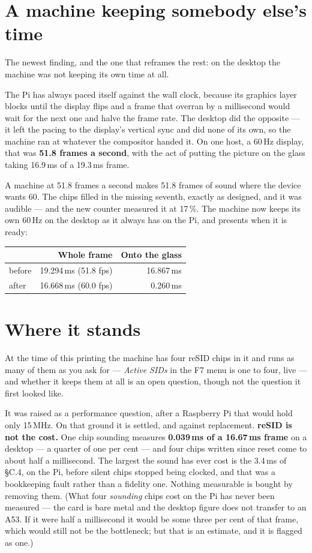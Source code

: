 \section{A machine keeping somebody else's time}
The newest finding, and the one that reframes the rest: on the desktop
the machine was not keeping its own time at all.

The Pi has always paced itself against the wall clock, because its
graphics layer blocks until the display flips and a frame that overran
by a millisecond would wait for the next one and halve the frame rate.
The desktop did the opposite --- it left the pacing to the display's
vertical sync and did none of its own, so the machine ran at whatever
the compositor handed it. On one host, a 60\,Hz display, that was
\textbf{51.8 frames a second}, with the act of putting the picture on
the glass taking 16.9\,ms of a 19.3\,ms frame.

A machine at 51.8 frames a second makes 51.8 frames of sound where the
device wants 60. The chips filled in the missing seventh, exactly as
designed, and it was audible --- and the new counter measured it at
17\,\%. The machine now keeps its own 60\,Hz on the desktop as it always
has on the Pi, and presents when it is ready:

\begin{center}
\small
\begin{tabular}{@{}l r r@{}}
\toprule
& \textbf{Whole frame} & \textbf{Onto the glass} \\
\midrule
before & 19.294\,ms (51.8 fps) & 16.867\,ms \\
after  & 16.668\,ms (60.0 fps) & 0.260\,ms \\
\bottomrule
\end{tabular}
\end{center}

\section{Where it stands}
At the time of this printing the machine has four reSID chips in it and
runs as many of them as you ask for --- \emph{Active SIDs} in the F7
menu is one to four, live --- and whether it keeps them at all is an
open question, though not the question it first looked like.

It was raised as a performance question, after a Raspberry Pi that would
hold only 15\,MHz. On that ground it is settled, and against
replacement. \textbf{reSID is not the cost.} One chip sounding measures
\textbf{0.039\,ms of a 16.67\,ms frame} on a desktop --- a quarter of one
per cent --- and four chips written since reset come to about half a
millisecond. The largest the sound has ever cost is the 3.4\,ms of §C.4,
on the Pi, before silent chips stopped being clocked, and that was a
bookkeeping fault rather than a fidelity one. Nothing measurable is
bought by removing them. (What four \emph{sounding} chips cost on the Pi
has never been measured --- the card is bare metal and the desktop
figure does not transfer to an A53. If it were half a millisecond it
would be some three per cent of that frame, which would still not be the
bottleneck; but that is an estimate, and it is flagged as one.)

